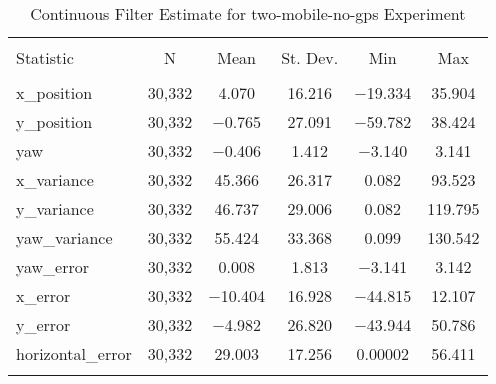 
\begin{table}[h] \centering 
  \caption{Continuous Filter Estimate for two-mobile-no-gps Experiment} 
  \label{tab:two_mobile_no_gps_continuous_summary} 
\begin{tabular}{@{\extracolsep{5pt}}lccccc} 
\\[-1.8ex]\hline 
\hline \\[-1.8ex] 
Statistic & \multicolumn{1}{c}{N} & \multicolumn{1}{c}{Mean} & \multicolumn{1}{c}{St. Dev.} & \multicolumn{1}{c}{Min} & \multicolumn{1}{c}{Max} \\ 
\hline \\[-1.8ex] 
x\_position & 30,332 & 4.070 & 16.216 & $-$19.334 & 35.904 \\ 
y\_position & 30,332 & $-$0.765 & 27.091 & $-$59.782 & 38.424 \\ 
yaw & 30,332 & $-$0.406 & 1.412 & $-$3.140 & 3.141 \\ 
x\_variance & 30,332 & 45.366 & 26.317 & 0.082 & 93.523 \\ 
y\_variance & 30,332 & 46.737 & 29.006 & 0.082 & 119.795 \\ 
yaw\_variance & 30,332 & 55.424 & 33.368 & 0.099 & 130.542 \\ 
yaw\_error & 30,332 & 0.008 & 1.813 & $-$3.141 & 3.142 \\ 
x\_error & 30,332 & $-$10.404 & 16.928 & $-$44.815 & 12.107 \\ 
y\_error & 30,332 & $-$4.982 & 26.820 & $-$43.944 & 50.786 \\ 
horizontal\_error & 30,332 & 29.003 & 17.256 & 0.00002 & 56.411 \\ 
\hline \\[-1.8ex] 
\end{tabular} 
\end{table} 
